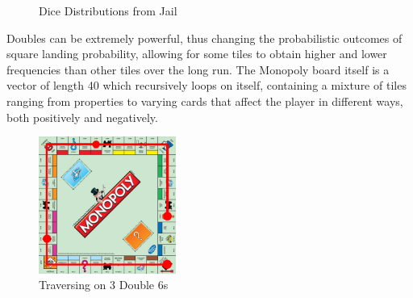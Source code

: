 \documentclass[12pt]{article}
\begin{document}
\begin{figure}[h]
  \centering
  \hfill
  \caption{Dice Distributions from Jail}
\end{figure}

Doubles can be extremely powerful, thus changing the probabilistic outcomes of square landing probability, allowing for some tiles to obtain higher and lower frequencies than other tiles over the long run.\cite{bradym} The Monopoly board itself is a vector of length 40 which recursively loops on itself, containing a mixture of tiles ranging from properties to varying cards that affect the player in different ways, both positively and negatively. 

\begin{figure}[h]
\centering
\includegraphics[width=0.4\textwidth]{triple_traverse.jpg}
\caption{Traversing on 3 Double 6s}
\end{figure}
\end{document}
